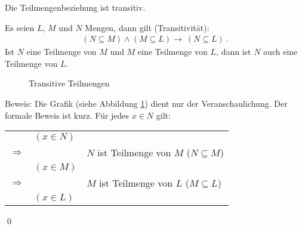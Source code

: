 \begin{Unit}[Bemerkung]
Die Teilmengenbeziehung ist transitiv.
\begin{Bemerkung}
  Es seien $L$, $M$ und $N$ Mengen, dann gilt (Transitivität):
  \begin{align}
    (N \subseteq M) \wedge (M \subseteq L) \rightarrow\ (N \subseteq L)\ .
  \end{align}
  Ist $N$ eine Teilmenge von $M$ und $M$ eine Teilmenge von $L$, dann ist $N$ 
  auch eine Teilmenge von $L$.
\end{Bemerkung}

\begin{figure}[htbp]
\begin{center}
  \caption{Transitive Teilmengen}
  \label{Abb:Mng:Transitive Teilmengen}
\end{center}
\end{figure}

Beweis: Die Grafik (siehe Abbildung \ref{Abb:Mng:Transitive Teilmengen}) 
dient nur der Veranschaulichung. Der formale Beweis ist kurz. Für jedes 
$x \in N$ gilt:

\begin{tabular}{l l | l}
  & $(x \in N)$ &  \\
  $\Rightarrow$ & & $N$ ist Teilmenge von $M$ ($N \subseteq M$) \\
  & $(x \in M)$ & \\
  $\Rightarrow$ & & $M$ ist Teilmenge von $L$ ($M \subseteq L$) \\
  & $(x \in L)$ & \\
\end{tabular} 

\qed
\end{Unit}

